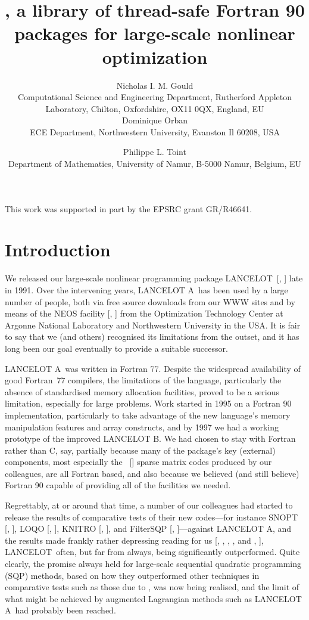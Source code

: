 \documentclass[acmtocl,acmnow]{acmtrans2m}
\title{\gal, a library of thread-safe Fortran 90
packages for large-scale nonlinear optimization}
\author{Nicholas I. M. Gould \\
Computational Science and Engineering Department,
Rutherford Appleton Laboratory,
Chilton, Oxfordshire, OX11 0QX, England, EU \\
Dominique Orban \\
ECE Department,  Northwestern University, Evanston Il 60208, USA
\and Philippe L. Toint \\
Department of Mathematics, University of Namur,
B-5000 Namur, Belgium, EU }
\newcommand{\lan}{{\sf LANCELOT}}
\newcommand{\lana}{{\sf LANCELOT A}}
\newcommand{\lanb}{{\sf LANCELOT B}}
\newcommand{\resetcounters}{\setcounter{equation}{0} \setcounter{figure}{0}
 \setcounter{table}{0}}
\newcommand{\lsection}[1]{\section{#1} \resetcounters \label{#1}}
\newcommand{\citebb}[1]{\citeauthor{#1}\ [\citeyear{#1}]}
\newcommand{\bciteb}[1]{\citeauthor{#1}, \citeyear{#1}}
\begin{document}
\begin{bottomstuff}
This work was supported in part by the EPSRC grant GR/R46641.
\end{bottomstuff}

\maketitle

\lsection{Introduction}

We released our large-scale nonlinear programming package \lan\
[\bciteb{ConnGoulToin92}] late in 1991. Over the intervening
years, \lana\ has been used by a large number of people, both
via free source downloads from our WWW sites
and by means of the NEOS facility [\bciteb{CzyzMessMore98}]
from the Optimization Technology Center at
Argonne National Laboratory and Northwestern University in the USA.
It is fair to say that we (and others) recognised its limitations
from the outset, and it has long been our goal eventually to provide
a suitable successor.

\lana\ was written in Fortran 77.
Despite the widespread availability of good
Fortran~77 compilers, the limitations of the language, particularly
the absence of standardised memory allocation facilities, proved to be
a serious limitation, especially for large problems.
Work started in 1995 on a Fortran 90 implementation,
particularly to take advantage of the new language's
memory manipulation features and array constructs, and by 1997 we had a
working prototype of the improved \lanb. We had chosen to stay with
Fortran rather than C, say, partially because many of the package's
key (external) components, most especially the \citebb{hsl:2002}
sparse matrix codes
produced by our colleagues, are all Fortran based, and also because
we believed (and still believe) Fortran 90 capable of providing
all of the facilities we needed.

Regrettably, at or around that time, a number of our colleagues
had started to release the results of comparative tests of their
new codes---for instance SNOPT [\bciteb{gillmurrsaun02:siopt}],
LOQO [\bciteb{VandShan99}],
KNITRO [\bciteb{ByrdHribNoce99:siopt}], and
FilterSQP [\bciteb{FletLeyf02}]---against \lana,
and the results made frankly rather depressing reading for us
[\bciteb{DolaMore00}, \bciteb{BensShanVand01}, and \bciteb{Chin01}], \lan\
often, but far from always, being significantly outperformed.
Quite clearly, the promise always held for large-scale
sequential quadratic programming (SQP) methods,
based on how they outperformed other techniques in comparative tests
such as those due to \cite{HockSchi81}, was now being realised, and the
limit of what might be achieved by augmented Lagrangian methods
such as \lana\ had probably been reached.
\end{document}
